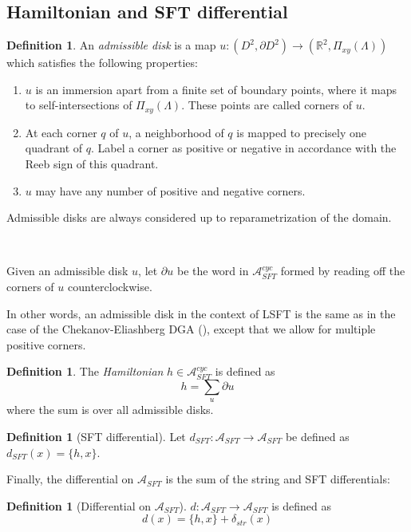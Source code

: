 \documentclass[a4paper,final, reqno]{amsart}
\theoremstyle{plain}
\theoremstyle{definition}
\newtheorem{Def}[Th]{Definition}
\newcommand{\A}{\mathcal{A}}
\begin{document}
	
	\subsection{Hamiltonian and SFT differential}
	
	\begin{Def}
		An \emph{admissible disk} is a map $u: (D^2, \partial D^2) \to (\mathbb{R}^2, \Pi_{xy}(\Lambda))$ which satisfies the following properties:
		
		\begin{enumerate}
			\item $u$ is an immersion apart from a finite set of boundary points, where it maps to self-intersections of $\Pi_{xy}(\Lambda)$. These points are called corners of $u$.
			\item At each corner $q$ of $u$, a neighborhood of $q$ is mapped to precisely one quadrant of $q$. Label a corner as positive or negative in accordance with the Reeb sign of this quadrant.
			\item $u$ may have any number of positive and negative corners.
		\end{enumerate}
		
		Admissible disks are always considered up to reparametrization of the domain. 
		
		\-\
		
		Given an admissible disk $u$, let $\partial u$ be the word in $\A_{SFT}^{cyc}$ formed by reading off the corners of $u$ counterclockwise.
		
	\end{Def}
	
	In other words, an admissible disk in the context of LSFT is the same as in the case of the Chekanov-Eliashberg DGA (), except that we allow for multiple positive corners.
	
	\begin{Def}
		The \emph{Hamiltonian} $h\in \A_{SFT}^{cyc}$ is defined as  
		\[ h = \sum_{u} \partial u\]
		where the sum is over all admissible disks.
	\end{Def}
	
	
	\begin{Def}[SFT differential]
		Let $d_{SFT}: \A_{SFT}\to \A_{SFT}$ be defined as $d_{SFT}(x) = \{h,x\}$. 
	\end{Def}
	
	
	Finally, the differential on $\A_{SFT}$ is the sum of the string and SFT differentials:
	
	\begin{Def}[Differential on $\A_{SFT}$]
		$d:\A_{SFT} \to \A_{SFT}$ is defined as \[ d(x) = \{h,x\} + \delta_{str}(x)\]
	\end{Def}
	
\end{document}
